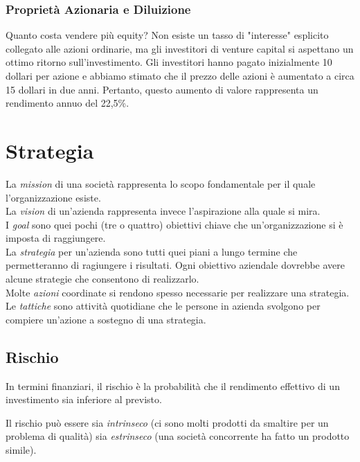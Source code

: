 \documentclass[a4paper,portrait,12pt]{article}
\theoremstyle{definition}
\begin{document}
\subsubsection{Proprietà Azionaria e Diluizione}

Quanto costa vendere più equity?
Non esiste un tasso di "interesse" esplicito collegato alle azioni ordinarie, ma gli investitori di venture capital si aspettano un ottimo ritorno sull'investimento.
Gli investitori hanno pagato inizialmente 10 dollari per azione e abbiamo stimato che il prezzo delle azioni è aumentato a circa 15 dollari in due anni.
Pertanto, questo aumento di valore rappresenta un rendimento annuo del 22,5\%.



\newpage
\section{Strategia}

La \emph{mission} di una società rappresenta lo scopo fondamentale per il quale l'organizzazione esiste.\\

La \emph{vision} di un'azienda rappresenta invece l'aspirazione alla quale si mira.\\

I \emph{goal} sono quei pochi (tre o quattro) obiettivi chiave che un'organizzazione si è imposta di raggiungere.\\

La \emph{strategia} per un'azienda sono tutti quei piani a lungo termine che permetteranno di ragiungere i risultati.
Ogni obiettivo aziendale dovrebbe avere alcune strategie che consentono di realizzarlo.\\

Molte \emph{azioni} coordinate si rendono spesso necessarie per realizzare una strategia.\\

Le \emph{tattiche} sono attività quotidiane che le persone in azienda svolgono per compiere un'azione a sostegno di una strategia.

\subsection{Rischio}
In termini finanziari, il rischio è la probabilità che il rendimento effettivo di un investimento sia inferiore al previsto.

Il rischio può essere sia \emph{intrinseco} (ci sono molti prodotti da smaltire per un problema di qualità) sia \emph{estrinseco} (una società concorrente ha fatto un prodotto simile).\\
\end{document}
